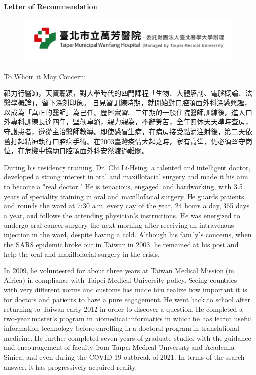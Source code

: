 \documentclass{letter}
\date{}
\begin{document}
\begin{letter}
{
\centering \Large \textbf{Letter of Recommendation}
}

\hfill
\begin{figure}%
    \includegraphics[width=0.3\textheight]{TMWH.png}
\end{figure}

\opening{To Whom it May Concern:} %
\medskip 

祁力行醫師，天資聰穎，對大學時代的四門課程「生物、大體解剖、電腦概論、法醫學概論」，留下深刻印象。
自見習訓練時期，就開始對口腔顎面外科深感興趣，以成為「真正的醫師」為己任。歷經實習、二年期的一般住院醫師訓練後，進入口外專科訓練長達四年，堅韌卓絕，親力親為，不辭勞苦，全年無休天天準時查房，守護患者，遵從主治醫師教導。即使感冒生病，在病房接受點滴注射後，第二天依舊打起精神執行口腔癌手術。在2003臺灣疫情大起之時，家有高堂，仍必須堅守崗位，在危機中協助口腔顎面外科安然渡過難關。

During his residency training, Dr. Chi Li-Hsing, a talented and intelligent doctor, developed a strong interest in oral and maxillofacial surgery and made it his aim to become a "real doctor."
He is tenacious, engaged, and hardworking, with 3.5 years of speciality training in oral and maxillofacial surgery.
He guards patients and rounds the ward at 7:30 a.m. every day of the year, 24 hours a day, 365 days a year, and follows the attending physician's instructions. He was energized to undergo oral cancer surgery the next morning after receiving an intravenous injection in the ward, despite having a cold.
Although his family's concerns, when the SARS epidemic broke out in Taiwan in 2003, he remained at his post and help the oral and maxillofacial surgery in the crisis.

In 2009, he volunteered for about three years at Taiwan Medical Mission (in Africa) in compliance with Taipei Medical University policy. Seeing countries with very different norms and customs has made him realize how important it is for doctors and patients to have a pure engagement. He went back to school after returning to Taiwan early 2012 in order to discover a question. He completed a two-year master's program in biomedical informatics in which he has learnt useful information technology before enrolling in a doctoral program in translational medicine. He further completed seven years of graduate studies with the guidance and encouragement of faculty from Taipei Medical University and Academia Sinica, and even during the COVID-19 outbreak of 2021. In terms of the search answer, it has progressively acquired reality.


\end{letter}
\end{document}
